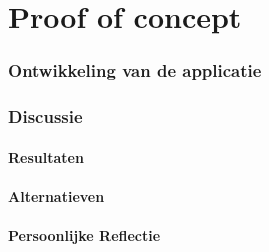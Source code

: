 
\chapter{Proof of concept}%
\label{ch:poc}


\lipsum[76-80]
\subsection{Ontwikkeling van de applicatie}
\subsection{Discussie}
\subsubsection{Resultaten}
\subsubsection{Alternatieven}
\subsubsection{Persoonlijke Reflectie}



